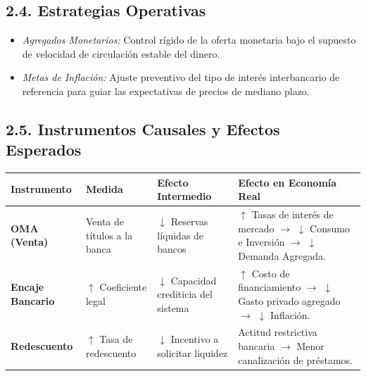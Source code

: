 \documentclass[12pt,spanish]{article}
\providecommand{\tightlist}{%
  \setlength{\itemsep}{0pt}\setlength{\parskip}{0pt}}
\newcounter{none}
\begin{document}
\subsection{2.4. Estrategias Operativas}\label{estrategias-operativas}

\begin{itemize}
\tightlist
\item
  \emph{Agregados Monetarios:} Control rígido de la oferta monetaria
  bajo el supuesto de velocidad de circulación estable del dinero.
\item
  \emph{Metas de Inflación:} Ajuste preventivo del tipo de interés
  interbancario de referencia para guiar las expectativas de precios de
  mediano plazo.
\end{itemize}

\subsection{2.5. Instrumentos Causales y Efectos
Esperados}\label{instrumentos-causales-y-efectos-esperados}

{\def\LTcaptype{none} %
\begin{longtable}[]{@{}
  >{\raggedright\arraybackslash}p{}
  >{\raggedright\arraybackslash}p{}
  >{\raggedright\arraybackslash}p{}
  >{\raggedright\arraybackslash}p{}@{}}
\toprule\noalign{}
\begin{minipage}[b]{\linewidth}\raggedright
Instrumento
\end{minipage} & \begin{minipage}[b]{\linewidth}\raggedright
Medida
\end{minipage} & \begin{minipage}[b]{\linewidth}\raggedright
Efecto Intermedio
\end{minipage} & \begin{minipage}[b]{\linewidth}\raggedright
Efecto en Economía Real
\end{minipage} \\
\midrule\noalign{}
\endhead
\bottomrule\noalign{}
\endlastfoot
\textbf{OMA (Venta)} & Venta de títulos a la banca & \(\downarrow\)
Reservas líquidas de bancos & \(\uparrow\) Tasas de interés de mercado
\(\rightarrow\) \(\downarrow\) Consumo e Inversión \(\rightarrow\)
\(\downarrow\) Demanda Agregada. \\
\textbf{Encaje Bancario} & \(\uparrow\) Coeficiente legal &
\(\downarrow\) Capacidad crediticia del sistema & \(\uparrow\) Costo de
financiamiento \(\rightarrow\) \(\downarrow\) Gasto privado agregado
\(\rightarrow\) \(\downarrow\) Inflación. \\
\textbf{Redescuento} & \(\uparrow\) Tasa de redescuento & \(\downarrow\)
Incentivo a solicitar liquidez & Actitud restrictiva bancaria
\(\rightarrow\) Menor canalización de préstamos. \\
\end{longtable}
}
\end{document}
